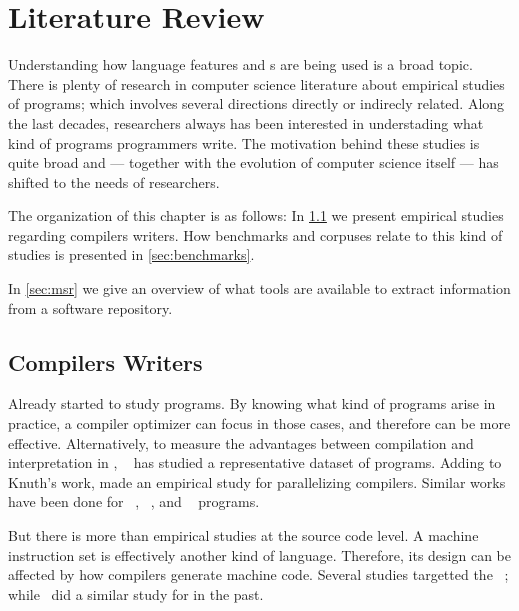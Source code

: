 
\chapter{Literature Review} \label{cha:literature-review} 

Understanding how language features and \api{}s are being used is a broad topic.
There is plenty of research in computer science literature about empirical studies of programs;
which involves several directions directly or indirecly related.
Along the last decades, researchers always has been interested in understading what kind of programs programmers write.
The motivation behind these studies is quite broad and --- together with the evolution of computer science itself --- has shifted to the needs of researchers.

The organization of this chapter is as follows:
In \cref{sec:compilers-writers} we present empirical studies regarding compilers writers.
How benchmarks and corpuses relate to this kind of studies is presented in \cref{sec:benchmarks}.

In \cref{sec:msr} we give an overview of what tools are available to extract information from a software repository.

\section{Compilers Writers} \label{sec:compilers-writers}

Already \cite{knuth_empirical_1971} started to study \fortran{} programs.
By knowing what kind of programs arise in practice, a compiler optimizer can focus in those cases, and therefore can be more effective.
Alternatively, to measure the advantages between compilation and interpretation in \basic{}, ~\cite{hammond_basic_1977} has studied a representative dataset of programs.
Adding to Knuth's work, \cite{shen_empirical_1990} made an empirical study for parallelizing compilers.
Similar works have been done for \cobol{}~\cite{salvadori_static_1975,chevance_static_1978}, \pascal{}~\cite{cook_contextual_1982}, and \apl{}~\cite{saal_properties_1975,saal_empirical_1977} programs.

But there is more than empirical studies at the source code level.
A machine instruction set is effectively another kind of language.
Therefore, its design can be affected by how compilers generate machine code.
Several studies targetted the \jvm{}~\cite{collberg_empirical_2007,odonoghue_bigram_2002,antonioli_analysis_1998}; while~\cite{cook_empirical_1989} did a similar study for \lilith{} in the past.


